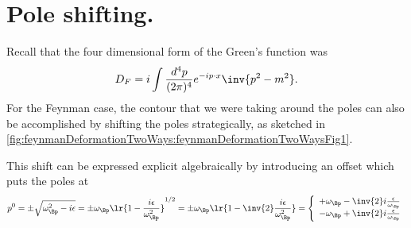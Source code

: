 %
%
\section{Pole shifting.}

Recall that the four dimensional form of the Green's function was
\begin{equation}\label{eqn:qftLecture13:400}
D_F = i \int \frac{d^4 p}{(2 \pi)^4} e^{-i p \cdot x} \inv{ p^2 - m^2 }.
\end{equation}
For the Feynman case, the contour that we were taking around the poles can also be accomplished by shifting the poles strategically, as sketched in \cref{fig:feynmanDeformationTwoWays:feynmanDeformationTwoWaysFig1}.


This shift can be expressed explicit algebraically by introducing an offset
which puts the poles at
\begin{equation}\label{eqn:qftLecture13:440}
p^0
= \pm \sqrt{ \omega_\Bp^2 - i \epsilon }
= \pm \omega_\Bp \lr{ 1 - \frac{i \epsilon}{\omega_\Bp^2} }^{1/2}
= \pm \omega_\Bp \lr{ 1 - \inv{2} \frac{i \epsilon}{\omega_\Bp^2} }
=
\left\{
\begin{array}{l}
+\omega_\Bp - \inv{2} i \frac{\epsilon}{\omega_\Bp} \\
-\omega_\Bp + \inv{2} i \frac{\epsilon}{\omega_\Bp} \\
\end{array}
\right.
\end{equation}

